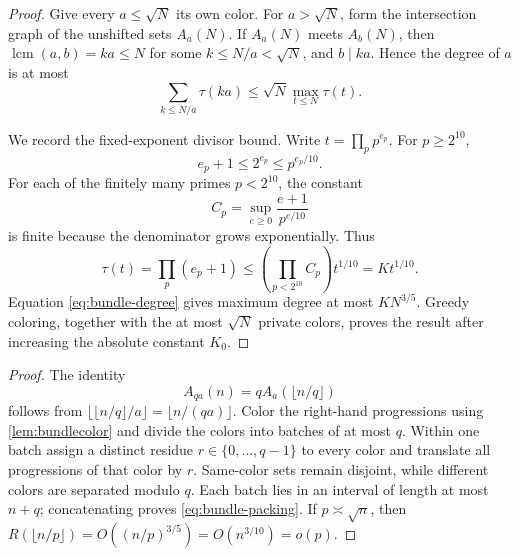 \documentclass[11pt,a4paper]{article}
\theoremstyle{plain}
\theoremstyle{definition}
\theoremstyle{remark}
\begin{document}
\label{pf:bundlecolor}
\lembundlecolor*
\begin{proof}
Give every $a\le\sqrt N$ its own color. For $a>\sqrt N$, form the intersection graph of the unshifted sets $A_a(N)$. If $A_a(N)$ meets $A_b(N)$, then $\operatorname{lcm}(a,b)=ka\le N$ for some $k\le N/a<\sqrt N$, and $b\mid ka$. Hence the degree of $a$ is at most
\[
 \sum_{k\le N/a}\tau(ka)
 \le\sqrt N\max_{t\le N}\tau(t).
\tag{A.1}\label{eq:bundle-degree}
\]

We record the fixed-exponent divisor bound. Write $t=\prod_pp^{e_p}$. For $p\ge2^{10}$,
\[
 e_p+1\le2^{e_p}\le p^{e_p/10}.
\]
For each of the finitely many primes $p<2^{10}$, the constant
\[
 C_p=\sup_{e\ge0}\frac{e+1}{p^{e/10}}
\]
is finite because the denominator grows exponentially. Thus
\[
 \tau(t)=\prod_p(e_p+1)
 \le\left(\prod_{p<2^{10}}C_p\right)t^{1/10}
 =K t^{1/10}.
\]
Equation \eqref{eq:bundle-degree} gives maximum degree at most $KN^{3/5}$. Greedy coloring, together with the at most $\sqrt N$ private colors, proves the result after increasing the absolute constant $K_0$.
\end{proof}

\label{pf:bundle}
\corbundle*
\begin{proof}
The identity
\[
 A_{qa}(n)=qA_a(\lfloor n/q\rfloor)
\]
follows from $\lfloor\lfloor n/q\rfloor/a\rfloor=\lfloor n/(qa)\rfloor$. Color the right-hand progressions using \cref{lem:bundlecolor} and divide the colors into batches of at most $q$. Within one batch assign a distinct residue $r\in\{0,\ldots,q-1\}$ to every color and translate all progressions of that color by $r$. Same-color sets remain disjoint, while different colors are separated modulo $q$. Each batch lies in an interval of length at most $n+q$; concatenating proves \eqref{eq:bundle-packing}. If $p\asymp\sqrt n$, then $R(\lfloor n/p\rfloor)=O((n/p)^{3/5})=O(n^{3/10})=o(p)$.
\end{proof}
\end{document}
